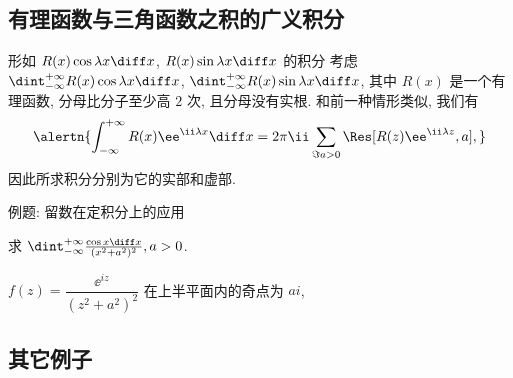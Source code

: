 \subsection{有理函数与三角函数之积的广义积分}

\begin{frame}{形如 $R(x)\cos{\lambda x}\diff x$,
	$R(x)\sin{\lambda x}\diff x$ 的积分\noexer}
	\onslide<+->
	考虑 $\dint_{-\infty}^{+\infty}R(x)\cos{\lambda x}\diff x$,
	$\dint_{-\infty}^{+\infty}R(x)\sin{\lambda x}\diff x$, 其中 $R(x)$ 是一个有理函数, 分母比分子至少高 $2$ 次, 且分母没有实根.
	\onslide<+->
	和前一种情形类似, 我们有
	\[\alertn{\int_{-\infty}^{+\infty}R(x)\ee^{\ii\lambda x}\diff x
	=2\pi\ii\sum_{\Im a>0}\Res[R(z)\ee^{\ii\lambda z},a],}
	\]
	\onslide<+->
	因此所求积分分别为它的实部和虚部.
\end{frame}


\begin{frame}{例题: 留数在定积分上的应用\noexer}
	\beqskip{2pt}
	\onslide<+->
	\begin{example}
		求 $\dint_{-\infty}^{+\infty}\frac{\cos x\diff x}{(x^2+a^2)^2}, a>0$.
	\end{example}

	\onslide<+->
	\begin{solution}
		$f(z)=\dfrac{\ee^{iz}}{(z^2+a^2)^2}$ 在上半平面内的奇点为 $ai$,
		\onslide<+->{
			\[\Res[f(z),ai]=\lim_{z\to ai}\left[\frac{\ee^{iz}}{(z+ai)^2}\right]'=-\frac{\ee^{-a}(a+1)\ii}{4a^3}.
	\]
		}\onslide<+->{
			\[\int_{-\infty}^{+\infty}\frac{\cos x\diff x}{(x^2+a^2)^2}=\frac{\pi \ee^{-a}(a+1)}{2a^3}.
	\]
		}
	\end{solution}
	\endgroup
\end{frame}


\subsection{其它例子}

